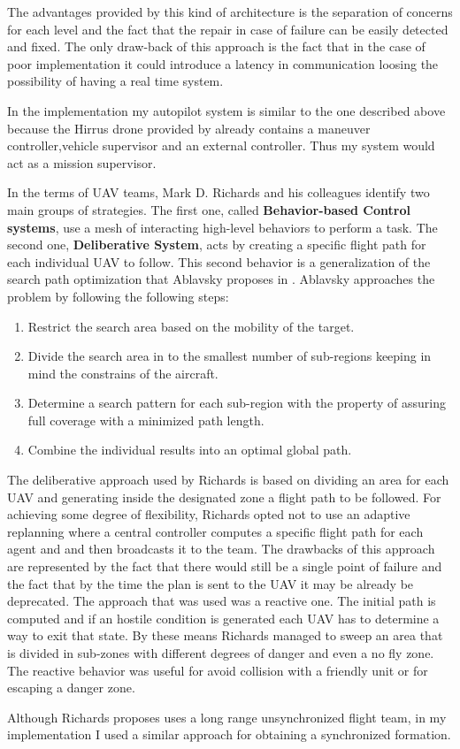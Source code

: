\newpage
The advantages provided by this kind of architecture is the separation of
concerns for each level and the fact that the repair in case of failure can be
easily detected and fixed. The only draw-back of this approach is the fact
that in the case of poor implementation it could introduce a latency in communication
loosing the possibility of having a real time system.

In the implementation my autopilot system is similar to the one described above 
because the Hirrus drone \cite{hirrus} provided by  already contains
a maneuver controller,vehicle supervisor  and an external controller. Thus my
system would act as a mission supervisor.

In the terms of UAV teams, Mark D. Richards and his colleagues \cite{cooperative}
identify two main groups of strategies. The first one,  called \textbf{Behavior-based
Control systems}, use a mesh of interacting high-level behaviors to perform a 
task. The second one, \textbf{Deliberative System}, acts by creating a specific
flight path for each individual UAV to follow. This second behavior is a 
generalization of the search path optimization that  Ablavsky proposes in 
  \cite{path-optimization}. Ablavsky approaches the problem by following the 
following steps:

\begin{enumerate}
\item Restrict the search area based on the mobility of the target.
\item Divide the search area in to the smallest number of sub-regions keeping in
mind the constrains of the aircraft.
\item Determine a search pattern for each sub-region with the property of assuring
full coverage with a minimized path length.
\item Combine the individual results into an optimal global path.
\end{enumerate}

The deliberative approach used by Richards is based on dividing an area for 
each UAV and generating inside the designated zone a flight path to be followed.
For achieving some degree of flexibility, Richards opted not to use an adaptive
replanning where a central controller computes a specific flight path for each
agent and and then broadcasts it to the team. The drawbacks of this approach are
represented by the fact that there would still be a single point of failure and
the fact that by the time the plan is sent to the UAV it may be already be 
deprecated. The approach that was used was a reactive one. The initial path
is computed and if an hostile condition is generated each UAV has to determine
a way to exit that state. By these means Richards managed to sweep an area
that is divided in sub-zones with different degrees of danger and even a no fly
zone. The reactive behavior was useful for avoid collision with a friendly unit
or for escaping a danger zone.

Although Richards proposes uses a long range unsynchronized flight team, in my 
implementation I used a similar approach for obtaining a synchronized formation.
